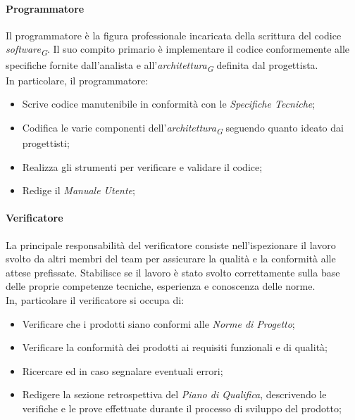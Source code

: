 \paragraph{Programmatore}
\label{par:programmatore}
Il programmatore è la figura professionale incaricata della scrittura del codice \textit{software}\textsubscript{\textit{G}}. Il suo compito primario è implementare il codice conformemente alle specifiche fornite dall'analista e all'\textit{architettura}\textsubscript{\textit{G}} definita dal progettista. \\
In particolare, il programmatore:
\begin{itemize}
    \item Scrive codice manutenibile in conformità con le \textit{Specifiche Tecniche};
    \item Codifica le varie componenti dell'\textit{architettura}\textsubscript{\textit{G}} seguendo quanto ideato dai progettisti;
    \item Realizza gli strumenti per verificare e validare il codice;
    \item Redige il \textit{Manuale Utente};
\end{itemize}

\paragraph{Verificatore}\label{verificatore} La principale responsabilità del verificatore consiste nell'ispezionare il lavoro svolto da altri membri del team per assicurare la qualità e la conformità alle attese prefissate.
Stabilisce se il lavoro è stato svolto correttamente sulla base delle proprie competenze tecniche, esperienza e conoscenza delle norme. \\
In, particolare il verificatore si occupa di:
\begin{itemize}
    \item Verificare che i prodotti siano conformi alle \textit{Norme di Progetto};
    \item Verificare la conformità dei prodotti ai requisiti funzionali e di qualità;
    \item Ricercare ed in caso segnalare eventuali errori;
    \item Redigere la sezione retrospettiva del \textit{Piano di Qualifica}, descrivendo le verifiche e le prove effettuate durante il processo di sviluppo del prodotto;
\end{itemize}

